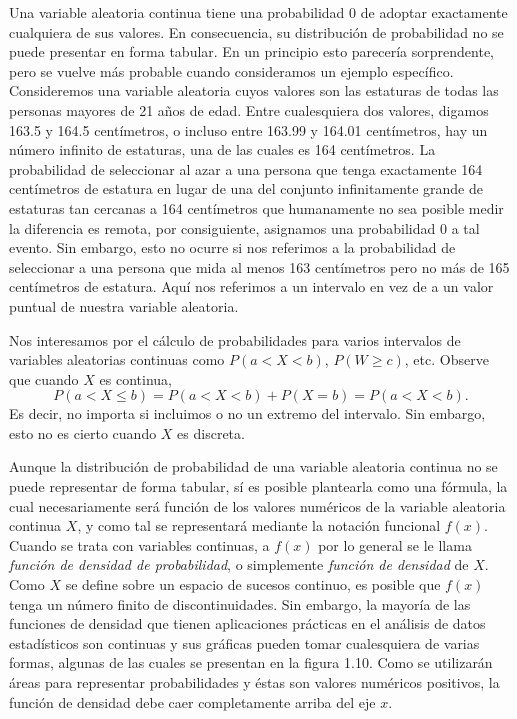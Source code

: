 Una variable aleatoria continua tiene una probabilidad 0 de adoptar exactamente cualquiera de sus valores. En consecuencia, su distribución de probabilidad no se puede presentar en forma tabular. En un principio esto parecería sorprendente, pero se vuelve más probable cuando consideramos un ejemplo específico. Consideremos una variable aleatoria cuyos valores son las estaturas de todas las personas mayores de 21 años de edad. Entre cualesquiera dos valores, digamos 163.5 y 164.5 centímetros, o incluso entre 163.99 y 164.01 centímetros, hay un número infinito de estaturas, una de las cuales es 164 centímetros. La probabilidad de seleccionar al azar a una persona que tenga exactamente 164 centímetros de estatura en lugar de una del conjunto infinitamente grande de estaturas tan cercanas a 164 centímetros que humanamente no sea posible medir la diferencia es remota, por consiguiente, asignamos una probabilidad 0 a tal evento. Sin embargo, esto no ocurre si nos referimos a la probabilidad de seleccionar a una persona que mida al menos 163 centímetros pero no más de 165 centímetros de estatura. Aquí nos referimos a un intervalo en vez de a un valor puntual de nuestra variable aleatoria.

Nos interesamos por el cálculo de probabilidades para varios intervalos de variables aleatorias continuas como $P(a < X < b)$, $P(W \geq c)$, etc. Observe que cuando $X$ es continua,
$$P(a < X \leq b) = P(a < X < b) + P(X = b) = P(a < X < b).$$
Es decir, no importa si incluimos o no un extremo del intervalo. Sin embargo, esto no es cierto cuando $X$ es discreta.

Aunque la distribución de probabilidad de una variable aleatoria continua no se puede representar de forma tabular, sí es posible plantearla como una fórmula, la cual necesariamente será función de los valores numéricos de la variable aleatoria continua $X$, y como tal se representará mediante la notación funcional $f(x)$. Cuando se trata con variables continuas, a $f(x)$ por lo general se le llama \emph{función de densidad de probabilidad}, o simplemente \emph{función de densidad} de $X$. Como $X$ se define sobre un espacio de sucesos continuo, es posible que $f(x)$ tenga un número finito de discontinuidades. Sin embargo, la mayoría de las funciones de densidad que tienen aplicaciones prácticas en el análisis de datos estadísticos son continuas y sus gráficas pueden tomar cualesquiera de varias formas, algunas de las cuales se presentan en la figura 1.10. Como se utilizarán áreas para representar probabilidades y éstas son valores numéricos positivos, la función de densidad debe caer completamente arriba del eje $x$.

